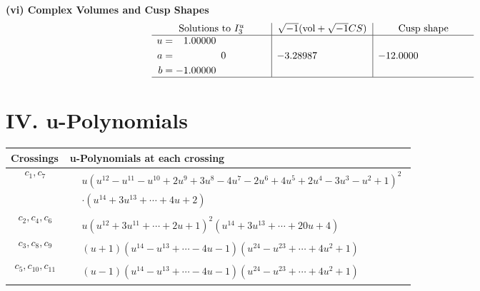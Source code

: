 \documentclass[1p]{elsarticle_modified}
\theoremstyle{definition}
\newcommand{\I}{\sqrt{-1}}
\begin{document}
\newpage\flushleft \textbf{(vi) Complex Volumes and Cusp Shapes}
$$\begin{array}{c|c|c}  
\text{Solutions to }I^u_{3}& \I (\text{vol} + \sqrt{-1}CS) & \text{Cusp shape}\\
 \hline 
\begin{aligned}
u &= \phantom{-}1.00000\phantom{ +0.000000I} \\
a &= \phantom{-0.000000 } 0 \\
b &= -1.00000\phantom{ +0.000000I}\end{aligned}
 & -3.28987\phantom{ +0.000000I} & -12.0000\phantom{ +0.000000I}\\
 \hline 
 \end{array}$$\newpage
\newpage\renewcommand{\arraystretch}{1}
\centering \section*{ IV. u-Polynomials}
\begin{tabular}{m{50pt}|m{274pt}}
Crossings & \hspace{64pt}u-Polynomials at each crossing \\
\hline $$\begin{aligned}c_{1},c_{7}\end{aligned}$$&$\begin{aligned}
&u(u^{12}- u^{11}- u^{10}+2 u^9+3 u^8-4 u^7-2 u^6+4 u^5+2 u^4-3 u^3- u^2+1)^2\\
&\cdot(u^{14}+3 u^{13}+\cdots+4 u+2)
\end{aligned}$\\
\hline $$\begin{aligned}c_{2},c_{4},c_{6}\end{aligned}$$&$\begin{aligned}
&u(u^{12}+3 u^{11}+\cdots+2 u+1)^{2}(u^{14}+3 u^{13}+\cdots+20 u+4)
\end{aligned}$\\
\hline $$\begin{aligned}c_{3},c_{8},c_{9}\end{aligned}$$&$\begin{aligned}
&(u+1)(u^{14}- u^{13}+\cdots-4 u-1)(u^{24}- u^{23}+\cdots+4 u^2+1)
\end{aligned}$\\
\hline $$\begin{aligned}c_{5},c_{10},c_{11}\end{aligned}$$&$\begin{aligned}
&(u-1)(u^{14}- u^{13}+\cdots-4 u-1)(u^{24}- u^{23}+\cdots+4 u^2+1)
\end{aligned}$\\
\hline
\end{tabular}\newpage\renewcommand{\arraystretch}{1}
\end{document}
